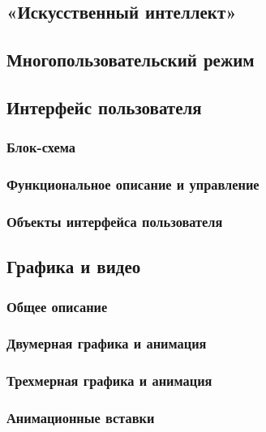 \documentclass{article}
\begin{document}
\subsection{«Искусственный интеллект»}

\subsection{Многопользовательский режим}

\subsection{Интерфейс пользователя}

\subsubsection{Блок-схема}

\subsubsection{Функциональное описание и управление}

\subsubsection{Объекты интерфейса пользователя}

\subsection{Графика и видео}

\subsubsection{Общее описание}

\subsubsection{Двумерная графика и анимация}

\subsubsection{Трехмерная графика и анимация}

\subsubsection{Анимационные вставки}
\end{document}
